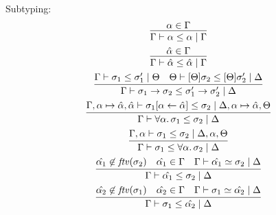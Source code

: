 Subtyping:
\begin{gather*}
  \infer{\Gamma \vdash \alpha \leq \alpha \mid \Gamma}{
    \alpha \in \Gamma
  }
  \\
  \infer{\Gamma \vdash \hat{\alpha} \leq \hat{\alpha} \mid \Gamma}{
    \hat{\alpha} \in \Gamma
  }
  \\
  \infer{\Gamma \vdash \sigma_1 \to \sigma_2 \leq \sigma_1' \to \sigma_2' \mid \Delta}{
    \Gamma \vdash \sigma_1 \leq \sigma_1' \mid \Theta
    &
    \Theta \vdash [\Theta]\sigma_2 \leq [\Theta]\sigma_2' \mid \Delta
  }
  \\
  \infer{\Gamma \vdash \forall \alpha\ldotp \sigma_1 \leq \sigma_2 \mid \Delta}{
    \Gamma, \alpha \mapsto \hat{\alpha}, \hat{\alpha} \vdash \sigma_1[\alpha \assign \hat{\alpha}] \leq \sigma_2 \mid \Delta, \alpha \mapsto \hat{\alpha}, \Theta
  }
  \\
  \infer{\Gamma \vdash \sigma_1 \leq \forall \alpha\ldotp \sigma_2 \mid \Delta}{
    \Gamma, \alpha \vdash \sigma_1 \leq \sigma_2 \mid \Delta, \alpha, \Theta
  }
  \\
  \infer{\Gamma \vdash \hat{\alpha_1} \leq \sigma_2 \mid \Delta}{
    \hat{\alpha_1} \not\in \mathit{ftv}(\sigma_2)
    &
    \hat{\alpha_1} \in \Gamma
    &
    \Gamma \vdash \hat{\alpha_1} \simeq \sigma_2 \mid \Delta
  }
  \\
  \infer{\Gamma \vdash \sigma_1 \leq \hat{\alpha_2} \mid \Delta}{
    \hat{\alpha_2} \not\in \mathit{ftv}(\sigma_1)
    &
    \hat{\alpha_2} \in \Gamma
    &
    \Gamma \vdash \sigma_1 \simeq \hat{\alpha_2} \mid \Delta
  }
\end{gather*}

